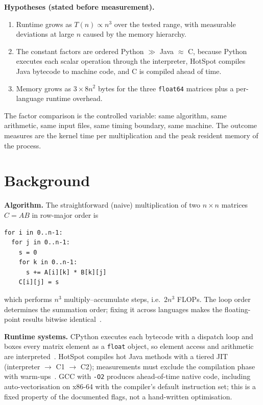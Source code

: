 \documentclass[11pt,a4paper]{article}
\begin{document}
\textbf{Hypotheses (stated before measurement).}
\begin{enumerate}
  \item[H1:] Runtime grows as $T(n) \propto n^3$ over the tested range, with
        measurable deviations at large $n$ caused by the memory hierarchy.
  \item[H2:] The constant factors are ordered Python $\gg$ Java $\approx$ C, because
        Python executes each scalar operation through the interpreter, HotSpot
        compiles Java bytecode to machine code, and C is compiled ahead of time.
  \item[H3:] Memory grows as $3 \times 8n^2$ bytes for the three \texttt{float64}
        matrices plus a per-language runtime overhead.
\end{enumerate}

The factor comparison is the controlled variable: same algorithm, same arithmetic,
same input files, same timing boundary, same machine. The outcome measures are the
kernel time per multiplication and the peak resident memory of the process.

\section{Background}

\textbf{Algorithm.} The straightforward (naive) multiplication of two $n \times n$
matrices $C = A B$ in row-major order is
\begin{verbatim}
for i in 0..n-1:
  for j in 0..n-1:
    s = 0
    for k in 0..n-1:
      s += A[i][k] * B[k][j]
    C[i][j] = s
\end{verbatim}
which performs $n^3$ multiply--accumulate steps, i.e.\ $2n^3$ FLOPs. The loop order
determines the summation order; fixing it across languages makes the floating-point
results bitwise identical~\cite{isoC11,pythonfloat}.

\textbf{Runtime systems.} CPython executes each bytecode with a dispatch loop and
boxes every matrix element as a \texttt{float} object, so element access and
arithmetic are interpreted~\cite{pythonfloat}. HotSpot compiles hot Java methods
with a tiered JIT (interpreter $\to$ C1 $\to$ C2); measurements must exclude the
compilation phase with warm-ups~\cite{jvms21}. GCC with \texttt{-O2} produces
ahead-of-time native code, including auto-vectorisation on x86-64 with the
compiler's default instruction set; this is a fixed property of the documented
flags, not a hand-written optimisation.
\end{document}

